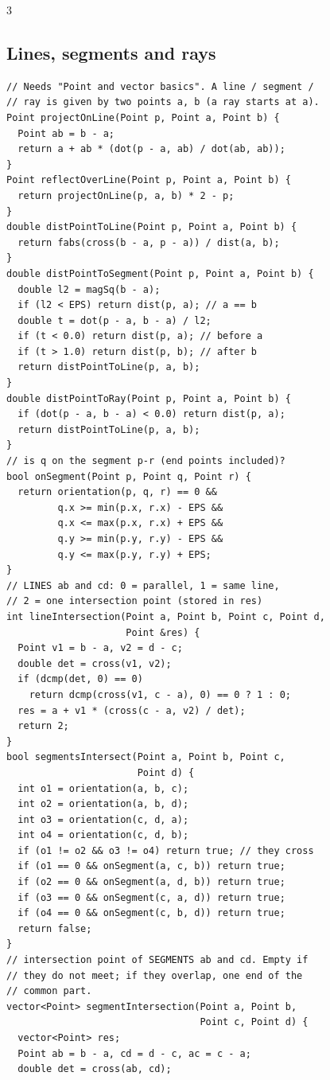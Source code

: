 \documentclass[8pt, a4paper]{article}
\begin{document}
\begin{multicols*}{3}
\subsection{Lines, segments and rays}
\begin{lstlisting}
// Needs "Point and vector basics". A line / segment /
// ray is given by two points a, b (a ray starts at a).
Point projectOnLine(Point p, Point a, Point b) {
  Point ab = b - a;
  return a + ab * (dot(p - a, ab) / dot(ab, ab));
}
Point reflectOverLine(Point p, Point a, Point b) {
  return projectOnLine(p, a, b) * 2 - p;
}
double distPointToLine(Point p, Point a, Point b) {
  return fabs(cross(b - a, p - a)) / dist(a, b);
}
double distPointToSegment(Point p, Point a, Point b) {
  double l2 = magSq(b - a);
  if (l2 < EPS) return dist(p, a); // a == b
  double t = dot(p - a, b - a) / l2;
  if (t < 0.0) return dist(p, a); // before a
  if (t > 1.0) return dist(p, b); // after b
  return distPointToLine(p, a, b);
}
double distPointToRay(Point p, Point a, Point b) {
  if (dot(p - a, b - a) < 0.0) return dist(p, a);
  return distPointToLine(p, a, b);
}
// is q on the segment p-r (end points included)?
bool onSegment(Point p, Point q, Point r) {
  return orientation(p, q, r) == 0 &&
         q.x >= min(p.x, r.x) - EPS &&
         q.x <= max(p.x, r.x) + EPS &&
         q.y >= min(p.y, r.y) - EPS &&
         q.y <= max(p.y, r.y) + EPS;
}
// LINES ab and cd: 0 = parallel, 1 = same line,
// 2 = one intersection point (stored in res)
int lineIntersection(Point a, Point b, Point c, Point d,
                     Point &res) {
  Point v1 = b - a, v2 = d - c;
  double det = cross(v1, v2);
  if (dcmp(det, 0) == 0)
    return dcmp(cross(v1, c - a), 0) == 0 ? 1 : 0;
  res = a + v1 * (cross(c - a, v2) / det);
  return 2;
}
bool segmentsIntersect(Point a, Point b, Point c,
                       Point d) {
  int o1 = orientation(a, b, c);
  int o2 = orientation(a, b, d);
  int o3 = orientation(c, d, a);
  int o4 = orientation(c, d, b);
  if (o1 != o2 && o3 != o4) return true; // they cross
  if (o1 == 0 && onSegment(a, c, b)) return true;
  if (o2 == 0 && onSegment(a, d, b)) return true;
  if (o3 == 0 && onSegment(c, a, d)) return true;
  if (o4 == 0 && onSegment(c, b, d)) return true;
  return false;
}
// intersection point of SEGMENTS ab and cd. Empty if
// they do not meet; if they overlap, one end of the
// common part.
vector<Point> segmentIntersection(Point a, Point b,
                                  Point c, Point d) {
  vector<Point> res;
  Point ab = b - a, cd = d - c, ac = c - a;
  double det = cross(ab, cd);

\end{lstlisting}
\end{multicols*}
\end{document}
